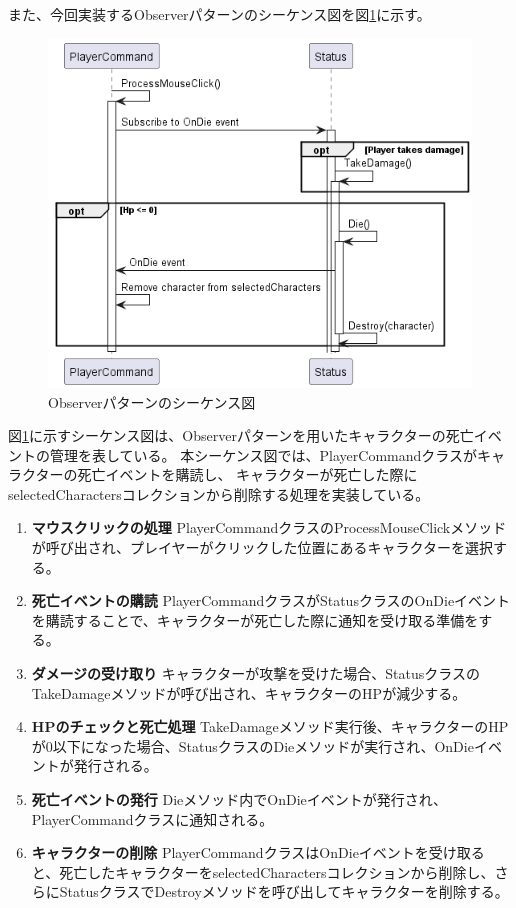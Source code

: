 \documentclass[dvipdfmx,fleqn,article]{jlreq}
\begin{document}
また、今回実装するObserverパターンのシーケンス図を図\ref{fig:Observer}に示す。
\begin{figure}[H]
    \centering
    \includegraphics[width=1\textwidth]{figures/Observer.png}
    \caption{Observerパターンのシーケンス図}
    \label{fig:Observer}
\end{figure}

図\ref{fig:Observer}に示すシーケンス図は、Observerパターンを用いたキャラクターの死亡イベントの管理を表している。
本シーケンス図では、PlayerCommandクラスがキャラクターの死亡イベントを購読し、
キャラクターが死亡した際にselectedCharactersコレクションから削除する処理を実装している。

\begin{enumerate}
    \item \textbf{マウスクリックの処理} PlayerCommandクラスのProcessMouseClickメソッドが呼び出され、プレイヤーがクリックした位置にあるキャラクターを選択する。
    \item \textbf{死亡イベントの購読} PlayerCommandクラスがStatusクラスのOnDieイベントを購読することで、キャラクターが死亡した際に通知を受け取る準備をする。
    \item \textbf{ダメージの受け取り} キャラクターが攻撃を受けた場合、StatusクラスのTakeDamageメソッドが呼び出され、キャラクターのHPが減少する。
    \item \textbf{HPのチェックと死亡処理} TakeDamageメソッド実行後、キャラクターのHPが0以下になった場合、StatusクラスのDieメソッドが実行され、OnDieイベントが発行される。
    \item \textbf{死亡イベントの発行} Dieメソッド内でOnDieイベントが発行され、PlayerCommandクラスに通知される。
    \item \textbf{キャラクターの削除} PlayerCommandクラスはOnDieイベントを受け取ると、死亡したキャラクターをselectedCharactersコレクションから削除し、さらにStatusクラスでDestroyメソッドを呼び出してキャラクターを削除する。
\end{enumerate}
\end{document}
